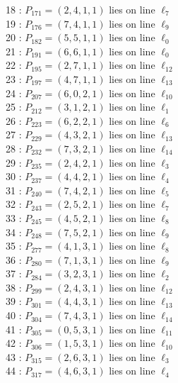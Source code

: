 \documentclass{article}
\begin{document}
{\begin{multicols}{2}
18 : $P_{171}=( 2, 4, 1, 1 )$ lies on line $\ell_{7}$\\
19 : $P_{176}=( 7, 4, 1, 1 )$ lies on line $\ell_{9}$\\
20 : $P_{182}=( 5, 5, 1, 1 )$ lies on line $\ell_{0}$\\
21 : $P_{191}=( 6, 6, 1, 1 )$ lies on line $\ell_{0}$\\
22 : $P_{195}=( 2, 7, 1, 1 )$ lies on line $\ell_{12}$\\
23 : $P_{197}=( 4, 7, 1, 1 )$ lies on line $\ell_{13}$\\
24 : $P_{207}=( 6, 0, 2, 1 )$ lies on line $\ell_{10}$\\
25 : $P_{212}=( 3, 1, 2, 1 )$ lies on line $\ell_{1}$\\
26 : $P_{223}=( 6, 2, 2, 1 )$ lies on line $\ell_{6}$\\
27 : $P_{229}=( 4, 3, 2, 1 )$ lies on line $\ell_{13}$\\
28 : $P_{232}=( 7, 3, 2, 1 )$ lies on line $\ell_{14}$\\
29 : $P_{235}=( 2, 4, 2, 1 )$ lies on line $\ell_{3}$\\
30 : $P_{237}=( 4, 4, 2, 1 )$ lies on line $\ell_{4}$\\
31 : $P_{240}=( 7, 4, 2, 1 )$ lies on line $\ell_{5}$\\
32 : $P_{243}=( 2, 5, 2, 1 )$ lies on line $\ell_{7}$\\
33 : $P_{245}=( 4, 5, 2, 1 )$ lies on line $\ell_{8}$\\
34 : $P_{248}=( 7, 5, 2, 1 )$ lies on line $\ell_{9}$\\
35 : $P_{277}=( 4, 1, 3, 1 )$ lies on line $\ell_{8}$\\
36 : $P_{280}=( 7, 1, 3, 1 )$ lies on line $\ell_{9}$\\
37 : $P_{284}=( 3, 2, 3, 1 )$ lies on line $\ell_{2}$\\
38 : $P_{299}=( 2, 4, 3, 1 )$ lies on line $\ell_{12}$\\
39 : $P_{301}=( 4, 4, 3, 1 )$ lies on line $\ell_{13}$\\
40 : $P_{304}=( 7, 4, 3, 1 )$ lies on line $\ell_{14}$\\
41 : $P_{305}=( 0, 5, 3, 1 )$ lies on line $\ell_{11}$\\
42 : $P_{306}=( 1, 5, 3, 1 )$ lies on line $\ell_{10}$\\
43 : $P_{315}=( 2, 6, 3, 1 )$ lies on line $\ell_{3}$\\
44 : $P_{317}=( 4, 6, 3, 1 )$ lies on line $\ell_{4}$\\

\end{multicols}}
\end{document}
